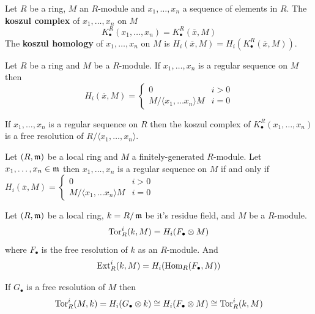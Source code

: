 \documentclass[12pt]{amsart}
\begin{document}
\begin{definition}
    Let $R$ be a ring, $M$ an $R$-module and $x_1, \ldots, x_n$ a sequence of elements in $R$. The \textbf{koszul complex} of $x_1, \ldots, x_n$ on $M$ 
    \[K_\bullet^R(x_1, \ldots, x_n) = K^R_\bullet(\overline{x}, M)\]
    The \textbf{koszul homology} of $x_1, \ldots, x_n$ on $M$ is 
    $H_i(\overline{x}, M) = H_i(K^R_\bullet(\overline{x}, M))$.
\end{definition}

\begin{theorem}
    Let $R$ be a ring and $M$ be a $R$-module. If $x_1, \ldots, x_n$ is a regular sequence on $M$ then 
    \[H_i(\overline{x}, M) = \begin{cases}
        0 & i > 0 \\ 
        M / \langle x_1, \ldots x_n \rangle M & i = 0
    \end{cases}\]
\end{theorem}

\begin{corollary}
    If $x_1, \ldots, x_n$ is a regular sequence on $R$ then the koszul complex of $K^R_\bullet(x_1, \ldots, x_n)$ is a free resolution of $R/\langle x_1, \ldots, x_n \rangle$.
\end{corollary}

\begin{theorem}
    Let $(R, \operatorname{\mathfrak{m}})$ be a local ring and $M$ a finitely-generated $R$-module. Let $x_1, \ldots, x_n \in \operatorname{\mathfrak{m}}$ then 
    $x_1, \ldots, x_n$ is a regular sequence on $M$ if and only if $H_i(\overline{x}, M) = \begin{cases}
        0 & i > 0 \\ 
        M / \langle x_1, \ldots x_n \rangle M & i = 0
    \end{cases}$
\end{theorem}

\begin{definition}
    Let $(R, \operatorname{\mathfrak{m}})$ be a local ring, $k = R/\operatorname{\mathfrak{m}}$ be it's residue field, and $M$ be a $R$-module. 
    \[\text{Tor}_R^i(k, M) = H_i(F_\bullet \otimes M)\]
    where $F_\bullet$ is the free resolution of $k$ as an $R$-module. And 
    \[\text{Ext}_R^i (k, M) = H_i(\operatorname{Hom}_R(F_\bullet, M))\]
\end{definition}

\begin{remark}
    If $G_\bullet$ is a free resolution of $M$ then 
    \[\text{Tor}^i_R( M, k)  = H_i(G_\bullet \otimes k) \cong H_i(F_\bullet \otimes M) \cong \text{Tor}^i_R(k, M)\]
\end{remark}
\end{document}
